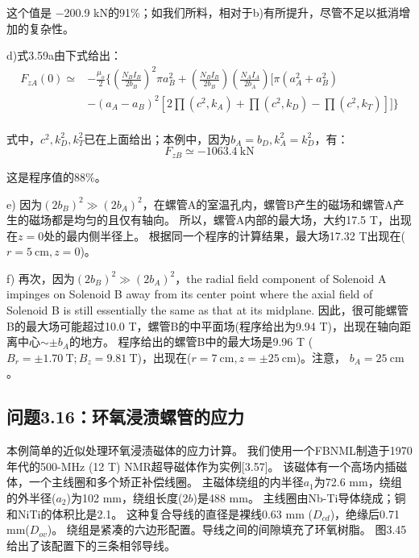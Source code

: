 这个值是 −200.9 kN的91\%；如我们所料，相对于b)有所提升，尽管不足以抵消增加的复杂性。 

d)式3.59a由下式给出：
\begin{equation*}
\begin{split}
F_{zA}(0)\simeq&-\frac{\mu_{o}}{2}\bigg\{(\frac{N_{B}I_{B}}{2b_{B}})^{2}\pi a_{B}^{2}+(\frac{N_{B}I_{B}}{2b_{B}})(\frac{N_{A}I_{A}}{2b_{A}})[\pi(a_{A}^{2}+a_{B}^{2})\\
&-(a_{A}-a_{B})^{2}[2\prod(c^{2},k_{A})+\prod(c^{2},k_{D})-\prod(c^{2},k_{T})]]\bigg\}\\%
\end{split}\tag{3.59a}
\end{equation*}

式中，$c^2, k_D^2,k_T^2$已在上面给出；本例中，因为$b_A=b_D, k_A^2=k_D^2$，有：
\begin{equation*}
F_{zB}\simeq -1063.4\ \mathrm{kN}
\end{equation*}

这是程序值的88\%。

e) 因为$(2b_B)^2\gg (2b_A)^2$，在螺管A的室温孔内，螺管B产生的磁场和螺管A产生的磁场都是均匀的且仅有轴向。
所以，螺管A内部的最大场，大约17.5 T，出现在$z=0$处的最内侧半径上。
根据同一个程序的计算结果，最大场17.32 T出现在($r=5\ \mathrm{cm},z=0$)。

f) 再次，因为$(2b_B)^2\gg (2b_A)^2$，the radial field component of Solenoid A impinges on Solenoid B away from its center point where the axial field of Solenoid B is still essentially the same as that at its midplane. 因此，很可能螺管B的最大场可能超过10.0 T，螺管B的中平面场(程序给出为9.94 T)，出现在轴向距离中心$\sim \pm b_A$的地方。
程序给出的螺管B中的最大场是9.96 T ($B_r = \pm 1.70\ \mathrm{T};B_z =9.81\ \mathrm{T}$)，出现在($r=7\ \mathrm{cm}, z=\pm 25\ \mathrm{cm}$)。注意，
$b_A=25\ \mathrm{cm}$。


\subsection{问题3.16：环氧浸渍螺管的应力}
本例简单的近似处理环氧浸渍磁体的应力计算。
我们使用一个FBNML制造于1970年代的500-MHz (12 T) NMR超导磁体作为实例[3.57]。
该磁体有一个高场内插磁体，一个主线圈和多个矫正补偿线圈。
主磁体绕组的内半径$a_1$为72.6 mm，绕组的外半径($a_2$)为102 mm，绕组长度($2b$)是488 mm。
主线圈由Nb-Ti导体绕成；铜和NiTi的体积比是2.1。
这种复合导线的直径是裸线0.63 mm ($D_{cd}$)，绝缘后0.71 mm($D_{ov}$)。
绕组是紧凑的六边形配置。导线之间的间隙填充了环氧树脂。
图3.45给出了该配置下的三条相邻导线。

